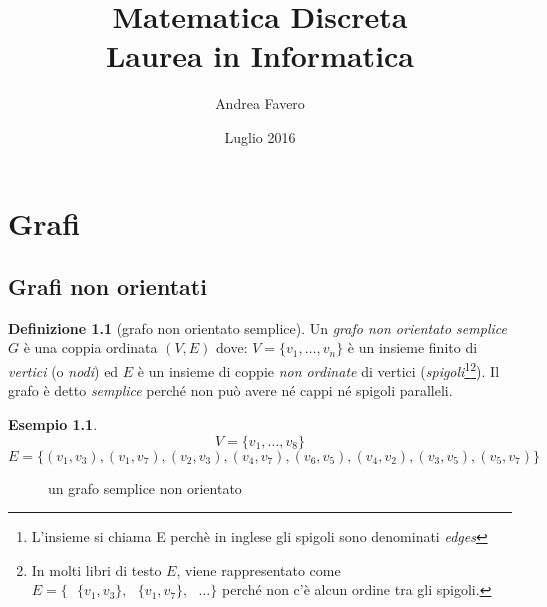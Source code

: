 \documentclass[a4paper, openany]{book}
\theoremstyle{plain}
\theoremstyle{definition}
\newtheorem{defn}{Definizione}[chapter]
\newtheorem{ese}{Esempio}[section]
\begin{document}
\title{Matematica Discreta\\Laurea in Informatica}
\author{Andrea Favero}
\date{Luglio 2016}
\maketitle


\tableofcontents    %


\chapter{Grafi}

\section{Grafi non orientati}

\begin{defn}[grafo non orientato semplice]	
Un \emph{grafo non orientato semplice} $G$ è una coppia ordinata $(V,E)$ dove: $V=\{v_1,\dots,v_n\}$ è
un insieme finito di \emph{vertici} (o \emph{nodi}) ed $E$ è un insieme di coppie
\emph{non ordinate} di vertici 
(\emph{spigoli}\footnote{L'insieme si chiama E perchè in inglese gli spigoli 
sono denominati \emph{edges}}\footnote{ In molti libri di testo $E$, viene rappresentato come
${E = \{ \text{ } \{v_1,v_3\},\text{ } \{v_1,v_7\}, \text{ } \dots \}}$ 
perché non c'è alcun ordine tra gli spigoli.}).
Il grafo è detto \emph{semplice} perché non può avere né cappi né spigoli paralleli.
\end{defn}

\begin{ese}
\[V = \{ v_1, \dots, v_8 \}\]
\[E = \{ (v_1,v_3), (v_1,v_7), (v_2,v_3), (v_4,v_7),(v_6,v_5), (v_4,v_2), (v_3,v_5), (v_5,v_7) \}\]
\end{ese}

\begin{figure}[!ht]
    \centering
    \caption{un grafo semplice non orientato}
\end{figure}
\end{document}
